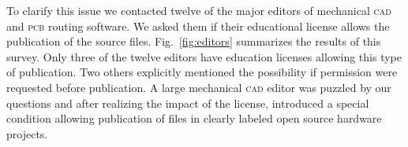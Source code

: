 \documentclass[letterpaper, 10 pt, conference]{ieeeconf}  %
\begin{document}

To clarify this issue we contacted twelve of the major editors of mechanical \textsc{cad} and \textsc{pcb} routing software.
We asked them if their educational license allows the publication of the source files. %
Fig.~\ref{fig:editors} summarizes the results of this survey.
Only three of the twelve editors have education licenses allowing this type of publication. 
Two others explicitly mentioned the possibility if permission were requested before publication.
A large mechanical \textsc{cad} editor was puzzled by our questions and after realizing the impact of the license, introduced a special condition allowing publication of files in clearly labeled open source hardware projects.
\end{document}
